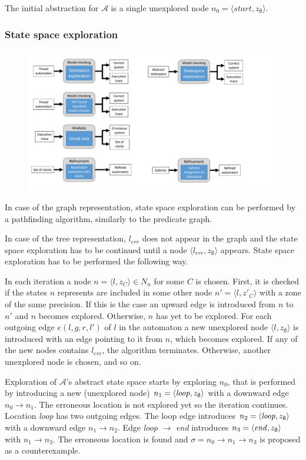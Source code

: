 \begin{runningExample}
	The initial abstraction for $\mathcal{A}$ is a single unexplored node $n_0=\langle \textit{start}, z_{\emptyset} \rangle$.
\end{runningExample}


\subsubsection{State space exploration}

\begin{figure}[h]
	\centering
	\includegraphics[width=.7\textwidth]{include/figures/modules_ssp_mc}
\end{figure}

In case of the graph representation, state space exploration can be performed by a pathfinding algorithm, similarly to the predicate graph.

In case of the tree representation, $l_{err}$ does not appear in the graph and the state space exploration has to be continued until a node $\langle l_{err}, z_{\emptyset} \rangle$ appears. State space exploration has to be performed the following way.

In each iteration a node $n=\langle l, z_{C} \rangle \in N_u$ for some $C$ is chosen. First, it is checked if the states $n$ represents are included in some other node $n'=\langle l, z'_{C} \rangle$ with a zone of the same precision. If this is the case an upward edge is introduced from $n$ to $n'$ and $n$ becomes explored. Otherwise, $n$ has yet to be explored. For each outgoing edge $e(l,g,r,l')$ of $l$ in the automaton a new unexplored node $\langle l, z_{\emptyset} \rangle$ is introduced with an edge pointing to it from $n$, which becomes explored. If any of the new nodes contains $l_{err}$, the algorithm terminates. Otherwise, another unexplored node is chosen, and so on.

\begin{runningExample}
	Exploration of $\mathcal{A}$'s abstract state space starts by exploring $n_0$, that is performed by introducing a new (unexplored node) $n_1=\langle \text{\emph{loop}}, z_\emptyset \rangle$ with a downward edge $n_0 \to n_1$. The erroneous location is not explored yet so the iteration continues. Location \emph{loop} has two outgoing edges. The loop edge introduces $n_2=\langle \text{\emph{loop}}, z_\emptyset \rangle$ with a downward edge $n_1 \to n_2$. Edge \emph{loop} $\to$ \emph{end} introduces $n_3=\langle \text{\emph{end}}, z_\emptyset \rangle$ with $n_1 \to n_3$. The erroneous location is found and $\sigma= n_0 \to n_1 \to n_3$ is proposed as a counterexample.
\end{runningExample}


